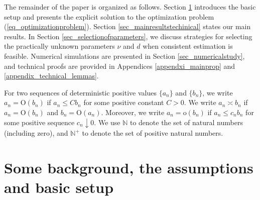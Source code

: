\documentclass[11pt]{article}
\newcommand{\OO}{\mathrm{O}}
\numberwithin{equation}{section}
\numberwithin{figure}{section}
\begin{document}
The remainder of the paper is organized as follows. Section \ref{sec_setupestimation} introduces the basic setup and presents the explicit solution to the optimization problem (\ref{eq_optimizationproblem}). Section \ref{sec_mainresultstechinical} states our main results. In Section \ref{sec_selectionofparameters}, we discuss strategies for selecting the practically unknown parameters $\nu$ and $d$ when consistent estimation is feasible. Numerical simulations are presented in Section \ref{sec_numericalstudy}, and technical proofs are provided in Appendices \ref{appendxi_mainprop} and \ref{appendix_technical_lemmas}.  


\vspace{3pt}

 For two sequences of deterministic positive values $\{a_n\}$ and $\{b_n\}$, we write $a_n=\mathrm{O}(b_n)$ if $a_n \leq C b_n$ for some positive constant $C>0$. We write $a_n \asymp  b_n$ if $a_n=\OO(b_n)$ and $b_n=\OO(a_n).$ Moreover, we write $a_n=\mathrm{o}(b_n)$ if $a_n \leq c_n b_n$ for some positive sequence $c_n \downarrow 0.$ We use $\mathbb{N}$ to denote the set of natural numbers (including zero), and $\mathbb{N}^+$ to denote the set of positive natural numbers.

\section{Some background, the assumptions and basic setup}\label{sec_setupestimation}
\end{document}
